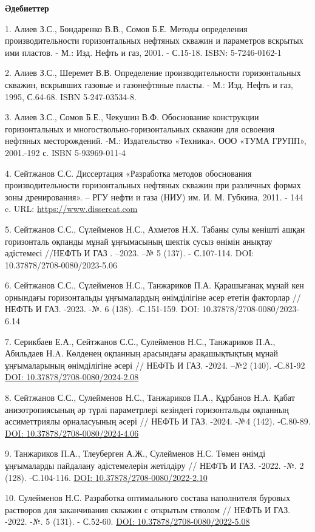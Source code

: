 \begin{center}
    {\bfseries Әдебиеттер}
    \end{center}
    \begin{noparindent}

1. Алиев З.С., Бондаренко В.В., Сомов Б.Е. Методы определения
производительности горизонтальных нефтяных скважин и параметров вскрытых
ими пластов. - М.: Изд. Нефть и газ, 2001. - С.15-18. ISBN:
5-7246-0162-1

2. Алиев З.С., Шеремет В.В. Определение производительности
горизонтальных скважин, вскрывших газовые и газонефтяные пласты. - М.:
Изд. Нефть и газ, 1995, С.64-68. ISBN 5-247-03534-8.

3. Алиев З.С., Сомов Б.Е., Чекушин В.Ф. Обоснование конструкции
горизонтальных и многоствольно-горизонтальных скважин для освоения
нефтяных месторождений. -М.: Издательство «Техника». ООО «ТУМА ГРУПП»,
2001.-192 с. ISBN 5-93969-011-4

4. Сейтжанов С.С. Диссертация «Разработка методов обоснования
производительности горизонтальных нефтяных скважин при различных формах
зоны дренирования». -- РГУ нефти и газа (НИУ) им. И. М. Губкина, 2011. -
144 c. URL: \url{https://www.dissercat.com}

5. Сейтжанов С.С., Сүлейменов Н.С., Ахметов Н.Х. Табаны сулы кенішті
ашқан горизонталь оқпанды мұнай ұңғымасының шектік сусыз өнімін анықтау
әдістемесі //НЕФТЬ И ГАЗ . --2023. --№ 5 (137). - С.107-114. DOI:
10.37878/2708-0080/2023-5.06

6. Сейтжанов С.С., Сүлейменов Н.С., Танжариков П.А. Қарашығанақ мұнай
кен орнындағы горизонтальды ұңғымалардың өнімділігіне әсер ететін
факторлар //НЕФТЬ И ГАЗ. -2023. -№. 6 (138). -С.151-159. DOI:
10.37878/2708-0080/2023-6.14

7. Серикбаев Е.А., Сейтжанов С.С., Сулейменов Н.С., Танжариков П.А.,
Абильдаев Н.A. Көлденең оқпанның арасындағы арақашықтықтың мұнай
ұңғымаларының өнімділігіне әсері // НЕФТЬ И ГАЗ. -2024. --№2 (140).
-С.81-92 \href{https://doi.org/10.37878/2708-0080/2024-2.08}{DOI:
10.37878/2708-0080/2024-2.08}

8. Сейтжанов С.С., Сулейменов Н.С., Танжариков П.А., Құрбанов Н.A. Қабат
анизотропиясының әр түрлі параметрлері кезіндегі горизонтальды оқпанның
ассиметтриялы орналасуының әсері // НЕФТЬ И ГАЗ. -2024. -№4 (142).
-С.80-89. \href{https://doi.org/10.37878/2708-0080/2024-4.06}{DOI:
10.37878/2708-0080/2024-4.06}

9. Танжариков П.А., Тлеуберген А.Ж., Сулейменов Н.С. Төмен өнімді
ұңғымаларды пайдалану әдістемелерін жетілдіру // НЕФТЬ И ГАЗ. -2022. -№.
2 (128). -С.104-116.
\href{https://doi.org/10.37878/2708-0080/2022-2.10}{DOI:
10.37878/2708-0080/2022-2.10}

10. Сулейменов Н.С. Разработка оптимального состава наполнителя буровых
растворов для заканчивания скважин с открытым стволом // НЕФТЬ И ГАЗ.
-2022. -№. 5 (131). - С.52-60.
\href{https://doi.org/10.37878/2708-0080/2022-5.08}{DOI:
10.37878/2708-0080/2022-5.08}
\end{noparindent}

